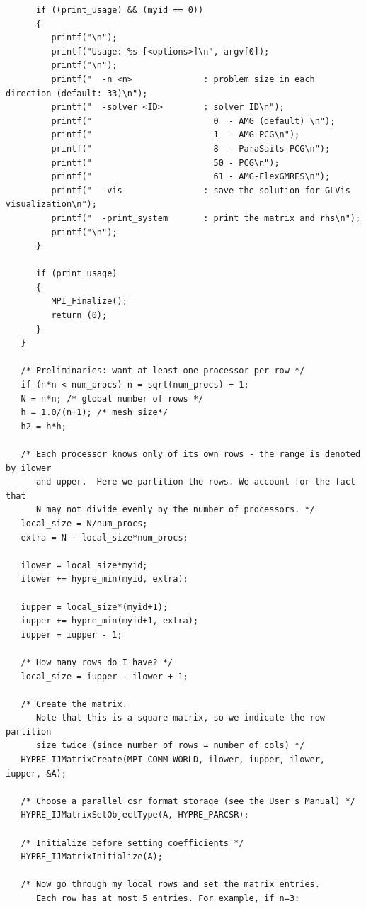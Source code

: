 \documentclass[a4paper,10pt]{article}
\begin{document}
\begin{lstlisting}
      if ((print_usage) && (myid == 0))
      {
         printf("\n");
         printf("Usage: %s [<options>]\n", argv[0]);
         printf("\n");
         printf("  -n <n>              : problem size in each direction (default: 33)\n");
         printf("  -solver <ID>        : solver ID\n");
         printf("                        0  - AMG (default) \n");
         printf("                        1  - AMG-PCG\n");
         printf("                        8  - ParaSails-PCG\n");
         printf("                        50 - PCG\n");
         printf("                        61 - AMG-FlexGMRES\n");
         printf("  -vis                : save the solution for GLVis visualization\n");
         printf("  -print_system       : print the matrix and rhs\n");
         printf("\n");
      }

      if (print_usage)
      {
         MPI_Finalize();
         return (0);
      }
   }

   /* Preliminaries: want at least one processor per row */
   if (n*n < num_procs) n = sqrt(num_procs) + 1;
   N = n*n; /* global number of rows */
   h = 1.0/(n+1); /* mesh size*/
   h2 = h*h;

   /* Each processor knows only of its own rows - the range is denoted by ilower
      and upper.  Here we partition the rows. We account for the fact that
      N may not divide evenly by the number of processors. */
   local_size = N/num_procs;
   extra = N - local_size*num_procs;

   ilower = local_size*myid;
   ilower += hypre_min(myid, extra);

   iupper = local_size*(myid+1);
   iupper += hypre_min(myid+1, extra);
   iupper = iupper - 1;

   /* How many rows do I have? */
   local_size = iupper - ilower + 1;

   /* Create the matrix.
      Note that this is a square matrix, so we indicate the row partition
      size twice (since number of rows = number of cols) */
   HYPRE_IJMatrixCreate(MPI_COMM_WORLD, ilower, iupper, ilower, iupper, &A);

   /* Choose a parallel csr format storage (see the User's Manual) */
   HYPRE_IJMatrixSetObjectType(A, HYPRE_PARCSR);

   /* Initialize before setting coefficients */
   HYPRE_IJMatrixInitialize(A);

   /* Now go through my local rows and set the matrix entries.
      Each row has at most 5 entries. For example, if n=3:


\end{lstlisting}
\end{document}
